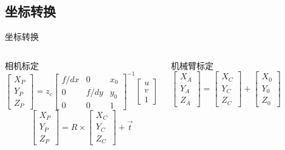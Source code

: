 \documentclass[xcolor=table,compress,blue]{beamer}
\begin{document}
	\subsection{坐标转换}
	\begin{frame}{坐标转换}
		\vspace{-24pt}
		\begin{columns}[t]
			\begin{exampleblock}{相机标定}
				\vspace{-10pt}
				\begin{equation*}
					\begin{bmatrix} X_P\\  Y_P\\  Z_P \end{bmatrix} = 
					z_c	{\begin{bmatrix} f/dx & 0 & x_{0} \\  0 & f/dy & y_{0} \\  0 & 0 & 1 \end{bmatrix}}^{-1} \begin{bmatrix} u\\  v\\  1 \end{bmatrix}
				\end{equation*}	
				\vspace{-10pt}
				\begin{equation*}
					\begin{bmatrix} X_{P}\\  Y_{P}\\  Z_{P} \end{bmatrix} =
					R \times \begin{bmatrix} X_{C}\\  Y_{C}\\  Z_{C} \end{bmatrix} +  \vec{t}
				\end{equation*}
			\end{exampleblock}
			\vspace{-10pt}
			\begin{exampleblock}{机械臂标定}
				\begin{equation*}
				\begin{bmatrix} X_{A}\\  Y_{A}\\  Z_{A}\end{bmatrix} =
				\begin{bmatrix} X_C\\  Y_C\\  Z_C \end{bmatrix} +
				\begin{bmatrix} X_{0}\\  Y_{0}\\  Z_{0}\end{bmatrix} 
				\end{equation*}
			\end{exampleblock}
		

\end{columns}
\end{frame}
\end{document}
